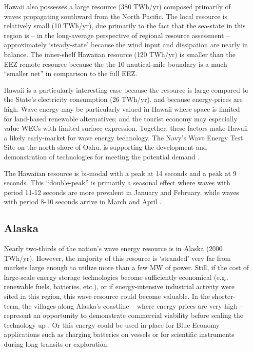 Hawaii also possesses a large resource (380 TWh/yr) composed primarily of waves propagating southward from the North Pacific. The local resource is relatively small (10 TWh/yr), due primarily to the fact that the sea-state in this region is -- in the long-average perspective of regional resource assessment -- approximately `steady-state' because the wind input and dissipation are nearly in balance. The inner-shelf Hawaiian resource (120 TWh/yr) is smaller than the EEZ remote resource because the the 10 nautical-mile boundary is a much ``smaller net'' in comparison to the full EEZ.

Hawaii is a particularly interesting case because the resource is large compared to the State's electricity consumption (26 TWh/yr), and because energy-prices are high. Wave energy may be particularly valued in Hawaii where space is limited for land-based renewable alternatives; and the tourist economy may especially value WECs with limited surface expression. Together, these factors make Hawaii a likely early-market for wave energy technology. The Navy's Wave Energy Test Site on the north shore of Oahu, is supporting the development and demonstration of technologies for meeting the potential demand \citep{crossEarlyResearchEfforts2015}.

The Hawaiian resource is bi-modal with a peak at 14 seconds and a peak at 9 seconds. This ``double-peak'' is primarily a seasonal effect where waves with period 11-12 seconds are more prevalent in January and February, while waves with period 8-10 seconds arrive in March and April \DIFdelbegin {}\DIFdelend \DIFaddbegin {}\DIFaddend . 

\subsection{Alaska}

Nearly two-thirds of the nation's wave energy resource is in Alaska (2000 TWh/yr). However, the majority of this resource is `stranded' very far from markets large enough to utilize more than a few MW of power. Still, if the cost of large-scale energy storage technologies become sufficiently economical (e.g., renewable fuels, batteries, etc.), or if energy-intensive industrial activity were sited in this region, this wave resource could become valuable. In the shorter-term, the villages along Alaska's coastline -- where energy prices are very high -- represent an opportunity to demonstrate commercial viability before scaling the technology up \cite{alaskaenergyauthority2019PowerCost2020}. Or this energy could be used in-place for Blue Economy applications such as charging batteries on vessels or for scientific instruments during long transits or exploration. 

